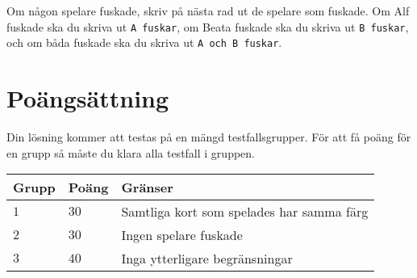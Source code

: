 Om någon spelare fuskade, skriv på nästa rad ut de spelare som fuskade.
Om Alf fuskade ska du skriva ut \texttt{A fuskar},
om Beata fuskade ska du skriva ut \texttt{B fuskar},
och om båda fuskade ska du skriva ut \texttt{A och B fuskar}.

\section*{Poängsättning}
Din lösning kommer att testas på en mängd testfallsgrupper. För att få poäng för en grupp så måste du klara alla testfall i gruppen.

\noindent
\begin{tabular}{| l | l | p{12cm} |}
  \hline
  \textbf{Grupp} & \textbf{Poäng} & \textbf{Gränser} \\ \hline
  $1$    & $30$      & Samtliga kort som spelades har samma färg \\ \hline
  $2$    & $30$      & Ingen spelare fuskade \\ \hline
  $3$    & $40$      & Inga ytterligare begränsningar  \\ \hline
\end{tabular}
